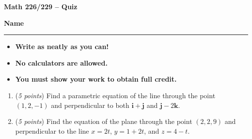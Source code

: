 \documentclass[12 pt]{article}
\begin{document}
  \begin{center}
    \textbf{\hfill Math 226/229 -- Quiz} \\
  \end{center}
  \medskip

  \noindent
  \textbf{Name}\ \rule{3.5in}{.4pt} \hfill
  \vspace{.1in}
  \hspace*{0.2in}
  \begin{itemize}
    \item \textbf{Write as neatly as you can!}
    \item \textbf{No calculators are allowed.}
    \item \textbf{You must show your work to obtain full credit.}
  \end{itemize}

	\medskip
  \noindent

  \begin{enumerate}
    \item (\textit{5 points})
    Find a parametric equation of the line through the point $(1, 2, -1)$ and
    perpendicular to both $\mathbf{i} + \mathbf{j}$ and
    $\mathbf{j} - 2\mathbf{k}$.

		\vspace{3in}
		\item (\textit{5 points})
		Find the equation of the plane through the point $(2, 2, 9)$ and
    perpendicular to the line $x = 2t$, $y = 1 + 2t$, and $z = 4 - t$.
  \end{enumerate}
\end{document}

